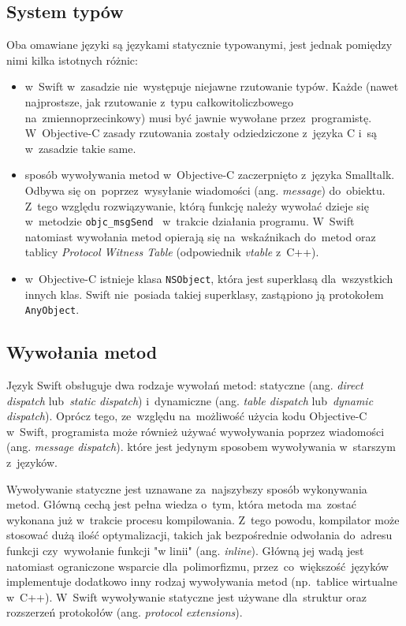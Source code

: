 \documentclass[mgr, shortabstract]{iithesis}
\newcommand{\ang}[1]{ang. \textit{#1}}
\begin{document}
\subsection{System typów}
\label{s:system_typow}

Oba omawiane języki są językami statycznie typowanymi, jest jednak pomiędzy nimi kilka istotnych różnic:

\begin{itemize}

    \item w~Swift w~zasadzie nie~występuje niejawne rzutowanie typów. Każde (nawet najprostsze, jak rzutowanie z~typu całkowitoliczbowego na~zmiennoprzecinkowy) musi być jawnie wywołane przez~programistę. W~Objective-C zasady rzutowania zostały odziedziczone z~języka C i~są w~zasadzie takie same.
    \item sposób wywoływania metod w~Objective-C zaczerpnięto z~języka Smalltalk. Odbywa się on~poprzez~wysyłanie wiadomości (\ang{message}) do~obiektu. Z~tego względu rozwiązywanie, którą funkcję należy wywołać dzieje się w~metodzie \texttt{objc_msgSend } w~trakcie działania programu. W~Swift natomiast wywołania metod opierają się na~wskaźnikach do~metod oraz tablicy \textit{Protocol Witness Table} (odpowiednik \textit{vtable} z~C++).
    \item w~Objective-C istnieje klasa \texttt{NSObject}, która jest superklasą dla~wszystkich innych klas. Swift nie~posiada takiej superklasy, zastąpiono ją protokołem \texttt{AnyObject}.

\end{itemize}

\subsection{Wywołania metod}
\label{s:wywolania_metod}

Język Swift obsługuje dwa rodzaje wywołań metod: statyczne (\ang{direct dispatch} lub~\textit{static dispatch}) i~dynamiczne (\ang{table dispatch} lub~\textit{dynamic dispatch}). Oprócz tego, ze~względu na~możliwość użycia kodu Objective-C w~Swift, programista może również używać wywoływania poprzez wiadomości (\ang{message dispatch}). które jest jedynym sposobem wywoływania w~starszym z~języków.

Wywoływanie statyczne jest uznawane za~najszybszy sposób wykonywania metod. Główną cechą jest pełna wiedza o~tym, która metoda ma~zostać wykonana już w~trakcie procesu kompilowania. Z~tego powodu, kompilator może stosować dużą ilość optymalizacji, takich jak bezpośrednie odwołania do~adresu funkcji czy~wywołanie funkcji "w linii" (\ang{inline}). Główną jej wadą jest natomiast ograniczone wsparcie dla~polimorfizmu, przez~co~większość języków implementuje dodatkowo inny rodzaj wywoływania metod (np.~tablice wirtualne w~C++). W~Swift wywoływanie statyczne jest używane dla~struktur oraz rozszerzeń protokołów (\ang{protocol extensions}).
\end{document}
